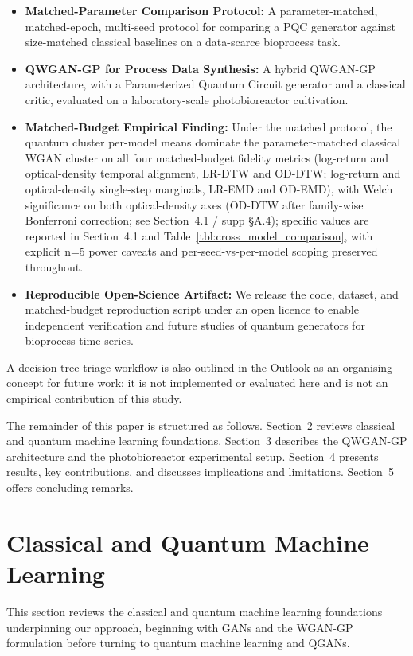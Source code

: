 \documentclass[12pt,twocolumn]{article}
\begin{document}
\begin{itemize}[nosep, leftmargin=*]
  \item \textbf{Matched-Parameter Comparison Protocol:} A parameter-matched, matched-epoch, multi-seed protocol for comparing a PQC generator against size-matched classical baselines on a data-scarce bioprocess task.
  \item \textbf{QWGAN-GP for Process Data Synthesis:} A hybrid QWGAN-GP architecture, with a Parameterized Quantum Circuit generator and a classical critic, evaluated on a laboratory-scale photobioreactor cultivation.
  \item \textbf{Matched-Budget Empirical Finding:} Under the matched protocol, the quantum cluster per-model means dominate the parameter-matched classical WGAN cluster on all four matched-budget fidelity metrics (log-return and optical-density temporal alignment, LR-DTW and OD-DTW; log-return and optical-density single-step marginals, LR-EMD and OD-EMD), with Welch significance on both optical-density axes (OD-DTW after family-wise Bonferroni correction; see Section~4.1 / supp \S A.4); specific values are reported in Section~4.1 and Table~\ref{tbl:cross_model_comparison}, with explicit n=5 power caveats and per-seed-vs-per-model scoping preserved throughout.
  \item \textbf{Reproducible Open-Science Artifact:} We release the code, dataset, and matched-budget reproduction script under an open licence to enable independent verification and future studies of quantum generators for bioprocess time series.
\end{itemize}

A decision-tree triage workflow is also outlined in the Outlook as an organising concept for future work; it is not implemented or evaluated here and is not an empirical contribution of this study.

The remainder of this paper is structured as follows. Section~2 reviews classical and quantum machine learning foundations. Section~3 describes the QWGAN-GP architecture and the photobioreactor experimental setup. Section~4 presents results, key contributions, and discusses implications and limitations. Section~5 offers concluding remarks.

\section{Classical and Quantum Machine Learning}


This section reviews the classical and quantum machine learning foundations underpinning our approach, beginning with GANs and the WGAN-GP formulation before turning to quantum machine learning and QGANs.
\end{document}
